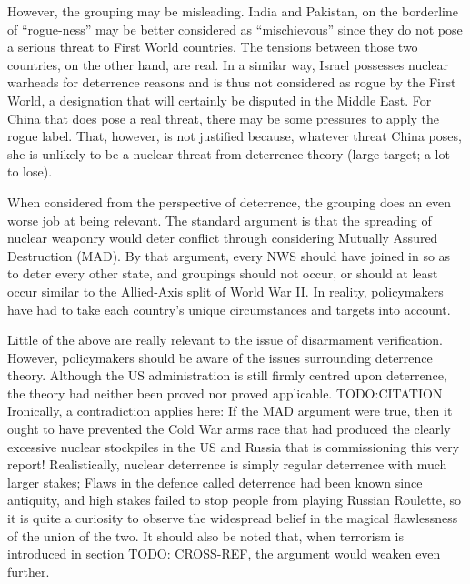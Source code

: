 \documentclass[twoside,titlepage,11pt,twocolumn,a4paper]{article}
\begin{document}
However, the grouping may be misleading. India and Pakistan, on the
borderline of ``rogue-ness'' may be better considered as
``mischievous'' since they do not pose a serious threat to First World
countries. The tensions between those two countries, on the other
hand, are real. In a similar way, Israel possesses nuclear warheads for
deterrence reasons and is thus not considered as rogue by the First
World, a designation that will certainly be disputed in the Middle
East. For China that does pose a real threat, there may be some
pressures to apply the rogue label. That, however, is not justified
because, whatever threat China poses, she is unlikely to be a nuclear
threat from deterrence theory (large target; a lot to lose).

When considered from the perspective of deterrence, the grouping does
an even worse job at being relevant. The standard argument is that the
spreading of nuclear weaponry would deter conflict through considering
Mutually Assured Destruction (MAD). By that argument, every NWS should
have joined in so as to deter every other state, and groupings should
not occur, or should at least occur similar to the Allied-Axis split
of World War II. In reality, policymakers have had to take each
country's unique circumstances and targets into account. 

Little of the above are really relevant to the issue of disarmament
verification. However, policymakers should be aware of the issues
surrounding deterrence theory. Although the US administration is still
firmly centred upon deterrence, the theory had neither been proved nor
proved applicable. TODO:CITATION Ironically, a contradiction applies
here: If the MAD argument were true, then it ought to have prevented
the Cold War arms race that had produced the clearly excessive nuclear
stockpiles in the US and Russia that is commissioning this very
report! Realistically, nuclear deterrence is simply regular deterrence
with much larger stakes; Flaws in the defence called deterrence had
been known since antiquity, and high stakes failed to stop people from
playing Russian Roulette, so it is quite a curiosity to observe the
widespread belief in the magical flawlessness of the union of the two.
It should also be noted that, when terrorism is introduced in section
TODO: CROSS-REF, the argument would weaken even further. 
\end{document}
